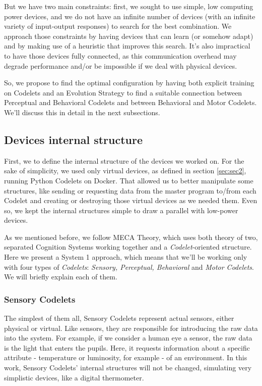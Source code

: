 But we have two main constraints: first, we sought to use simple, low computing power devices, and we do not have an infinite number of devices (with an infinite variety of input-output responses) to search for the best combination. We approach those constraints by having devices that can learn (or somehow adapt) and by making use of a heuristic that improves this search. It's also impractical to have those devices fully connected, as this communication overhead may degrade performance and/or be impossible if we deal with physical devices.

So, we propose to find the optimal configuration by having both explicit training on Codelets and an Evolution Strategy to find a suitable connection between Perceptual and Behavioral Codelets and between Behavioral and Motor Codelets. We'll discuss this in detail in the next subsections.



\subsection{Devices internal structure}
 First, we to define the internal structure of the devices we worked on. For the sake of simplicity, we used only virtual devices, as defined in section \ref{sec:sec2}, running Python Codelets on Docker. That allowed us to better manipulate some structures, like sending or requesting data from the master program to/from each Codelet and creating or destroying those virtual devices as we needed them. Even so, we kept the internal structures simple to draw a parallel with low-power devices. 
 
 As we mentioned before, we follow MECA Theory, which uses both \cite{Osman2004} theory of two, separated Cognition Systems working together and a \emph{Codelet}-oriented structure. Here we present a System 1 approach, which means that we'll be working only with four types of \emph{Codelets}: \emph{Sensory, Perceptual, Behavioral} and \emph{Motor Codelets}. We will briefly explain each of them.
 
 
 \subsubsection{Sensory Codelets}
 The simplest of them all, Sensory Codelets represent actual sensors, either physical or virtual. Like sensors, they are responsible for introducing the raw data into the system. For example, if we consider a human eye a sensor, the raw data is the light that enters the pupils. Here, it requests information about a specific attribute - temperature or luminosity, for example - of an environment. In this work, Sensory Codelets' internal structures will not be changed, simulating very simplistic devices, like a digital thermometer.
 
